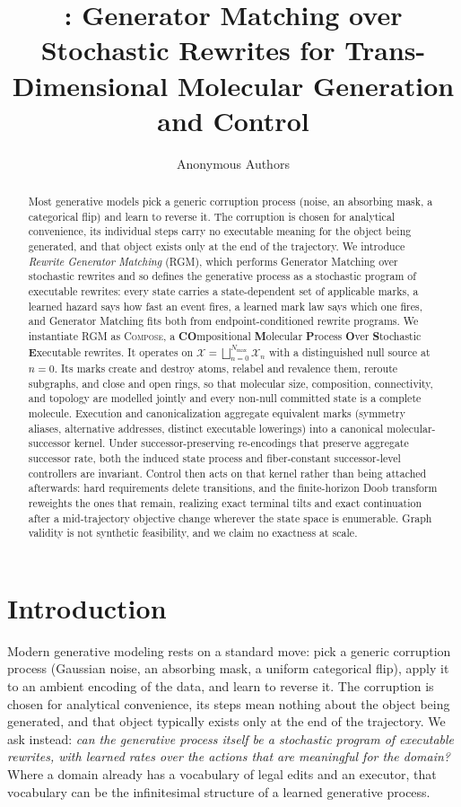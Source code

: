 \documentclass{article}
\title{\method: Generator Matching over Stochastic Rewrites for Trans-Dimensional Molecular Generation and Control}
\author{Anonymous Authors}
\date{}
\newcommand{\method}{\textsc{Compose}\xspace}
\newcommand{\rgm}{\textsc{RGM}\xspace}
\newcommand{\X}{\mathcal{X}}
\theoremstyle{definition}
\theoremstyle{remark}
\begin{document}
\maketitle

\begin{abstract}
Most generative models pick a generic corruption process (noise, an absorbing mask, a categorical flip) and learn to reverse it. The corruption is chosen for analytical convenience, its individual steps carry no executable meaning for the object being generated, and that object exists only at the end of the trajectory. We introduce \emph{Rewrite Generator Matching} (\rgm), which performs Generator Matching over stochastic rewrites and so defines the generative process as a stochastic program of executable rewrites: every state carries a state-dependent set of applicable marks, a learned hazard says how fast an event fires, a learned mark law says which one fires, and Generator Matching fits both from endpoint-conditioned rewrite programs. We instantiate \rgm as \method, a \textbf{CO}mpositional \textbf{M}olecular \textbf{P}rocess \textbf{O}ver \textbf{S}tochastic \textbf{E}xecutable rewrites. It operates on $\X=\bigsqcup_{n=0}^{N_{\max}}\X_n$ with a distinguished null source at $n=0$. Its marks create and destroy atoms, relabel and revalence them, reroute subgraphs, and close and open rings, so that molecular size, composition, connectivity, and topology are modelled jointly and every non-null committed state is a complete molecule. Execution and canonicalization aggregate equivalent marks (symmetry aliases, alternative addresses, distinct executable lowerings) into a canonical molecular-successor kernel. Under successor-preserving re-encodings that preserve aggregate successor rate, both the induced state process and fiber-constant successor-level controllers are invariant. Control then acts on that kernel rather than being attached afterwards: hard requirements delete transitions, and the finite-horizon Doob transform reweights the ones that remain, realizing exact terminal tilts and exact continuation after a mid-trajectory objective change wherever the state space is enumerable. Graph validity is not synthetic feasibility, and we claim no exactness at scale.
\end{abstract}

\section{Introduction}

Modern generative modeling rests on a standard move: pick a generic corruption process (Gaussian noise, an absorbing mask, a uniform categorical flip), apply it to an ambient encoding of the data, and learn to reverse it. The corruption is chosen for analytical convenience, its steps mean nothing about the object being generated, and that object typically exists only at the end of the trajectory. We ask instead: \emph{can the generative process itself be a stochastic program of executable rewrites, with learned rates over the actions that are meaningful for the domain?} Where a domain already has a vocabulary of legal edits and an executor, that vocabulary can be the infinitesimal structure of a learned generative process.
\end{document}
